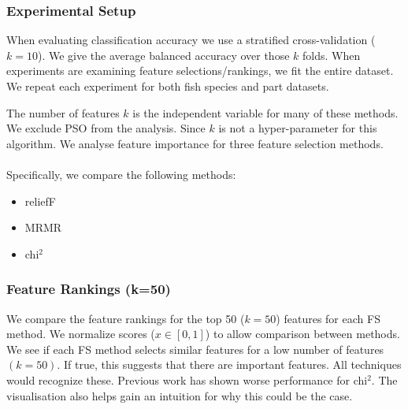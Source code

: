 \documentclass[runningheads]{llncs}
\begin{document}
\subsubsection{Experimental Setup}

When evaluating classification accuracy we use a stratified cross-validation ($k=10$).
We give the average balanced accuracy over those $k$ folds.
When experiments are examining feature selections/rankings, we fit the entire dataset.
We repeat each experiment for both fish species and part datasets.

The number of features $k$ is the independent variable for many of these methods.
We exclude PSO \cite{kennedy1995particle,kennedy1997discrete} from the analysis.
Since $k$ is not a hyper-parameter for this algorithm.
We analyse feature importance for three feature selection methods.
\\\\
Specifically, we compare the following methods:

\begin{itemize}
  \item reliefF \cite{aizerman1964theoretical}
  \item MRMR \cite{ding2005minimum}
  \item chi$^2$ \cite{liu1995chi2}
\end{itemize}

\subsubsection{Feature Rankings (k=50)}
\label{sec:results-visualisation-feature-rankings-50}

We compare the feature rankings for the top 50 ($k=50$) features for each FS method.
We normalize scores ($x \in [0,1]$) to allow comparison between methods.
We see if each FS method selects similar features for a low number of features $(k = 50)$.
If true, this suggests that there are important features.
All techniques would recognize these. Previous work \cite{wood2021classification,wood2021feature} has shown worse performance for chi$^2$.
The visualisation also helps gain an intuition for why this could be the case.
\end{document}
